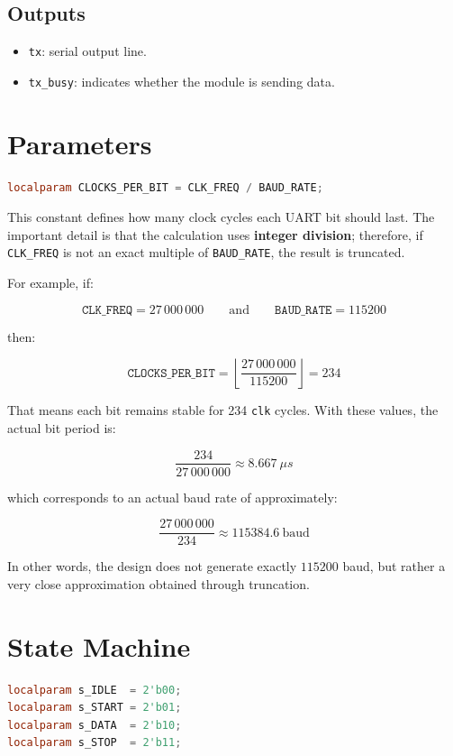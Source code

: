 \documentclass[12pt]{article}
\begin{document}
\subsection*{Outputs}

\begin{itemize}
    \item \texttt{tx}: serial output line.
    \item \texttt{tx\_busy}: indicates whether the module is sending data.
\end{itemize}

\section{Parameters}

\begin{lstlisting}[language=Verilog]
localparam CLOCKS_PER_BIT = CLK_FREQ / BAUD_RATE;
\end{lstlisting}

This constant defines how many clock cycles each UART bit should last. The important detail is that the calculation uses \textbf{integer division}; therefore, if \texttt{CLK\_FREQ} is not an exact multiple of \texttt{BAUD\_RATE}, the result is truncated.

For example, if:

\[
\texttt{CLK\_FREQ} = 27\,000\,000
\qquad\text{and}\qquad
\texttt{BAUD\_RATE} = 115200
\]

then:

\[
\texttt{CLOCKS\_PER\_BIT} = \left\lfloor \frac{27\,000\,000}{115200} \right\rfloor = 234
\]

That means each bit remains stable for 234 \texttt{clk} cycles. With these values, the actual bit period is:

\[
\frac{234}{27\,000\,000} \approx 8.667~\mu s
\]

which corresponds to an actual baud rate of approximately:

\[
\frac{27\,000\,000}{234} \approx 115384.6~\text{baud}
\]

In other words, the design does not generate exactly \(115200\) baud, but rather a very close approximation obtained through truncation.

\section{State Machine}

\begin{lstlisting}[language=Verilog]
localparam s_IDLE  = 2'b00;
localparam s_START = 2'b01;
localparam s_DATA  = 2'b10;
localparam s_STOP  = 2'b11;
\end{lstlisting}
\end{document}
